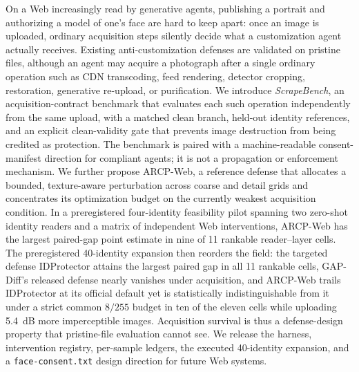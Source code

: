 On a Web increasingly read by generative agents, publishing a portrait and
authorizing a model of one's face are hard to keep apart: once an image is
uploaded, ordinary acquisition steps silently decide what a customization
agent actually receives. Existing anti-customization defenses are validated on
pristine files, although an agent may acquire a photograph after a single
ordinary operation such as CDN transcoding, feed rendering, detector cropping,
restoration, generative re-upload, or purification. We introduce
\emph{ScrapeBench}, an acquisition-contract benchmark that evaluates each such
operation independently from the same upload, with a matched clean branch,
held-out identity references, and an explicit clean-validity gate that
prevents image destruction from being credited as protection. The benchmark is
paired with a machine-readable consent-manifest direction for compliant agents;
it is not a propagation or enforcement mechanism.
We further propose ARCP-Web, a reference defense that allocates a bounded,
texture-aware perturbation across coarse and detail grids and concentrates its
optimization budget on the currently weakest acquisition condition. In a
preregistered four-identity feasibility pilot spanning two zero-shot identity
readers and a matrix of independent Web interventions, ARCP-Web has the largest
paired-gap point estimate in nine of 11 rankable reader--layer cells. The
preregistered 40-identity expansion then reorders the field: the targeted
defense IDProtector attains the largest paired gap in all 11 rankable cells,
GAP-Diff's released defense nearly vanishes under acquisition, and ARCP-Web
trails IDProtector at its official default yet is statistically
indistinguishable from it under a strict common $8/255$ budget in ten of the
eleven cells while uploading 5.4~dB more imperceptible images. Acquisition
survival is thus a defense-design property that pristine-file evaluation
cannot see. We release the harness, intervention registry, per-sample ledgers,
the executed 40-identity expansion, and a \texttt{face-consent.txt} design
direction for future Web systems.
